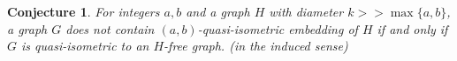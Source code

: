 \documentclass[a4paper]{article}
\newtheorem{Question}{Question}
\newtheorem{definition}{Definition}
\newtheorem{conjecture}[theorem]{Conjecture}
\begin{document}
\begin{conjecture}\label{conj:too-general}
 For  integers $a,b$ and a graph $H$ with diameter $k>> \max\{a,b\}$, a graph $G$ does not contain $(a,b)$-quasi-isometric embedding of $H$ if and only if $G$ is quasi-isometric to an $H$-free graph. (in the induced sense) 
\end{conjecture} 
%
 
 
% 
% 
% 
 
% 
%
\end{document}
